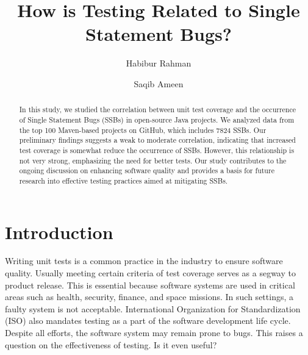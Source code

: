 \documentclass[sigconf,nonacm]{acmart}
\begin{document}
\title{How is Testing Related to Single Statement Bugs?}

\author{Habibur Rahman}

\author{Saqib Ameen}
\authornotemark[1]
\authornotemark[2]




\begin{abstract}
	In this study, we studied the correlation between unit test coverage and the occurrence of Single Statement Bugs (SSBs) in open-source Java projects. We analyzed data from the top 100 Maven-based projects on GitHub, which includes 7824 SSBs. Our preliminary findings suggests a weak to moderate correlation, indicating that increased test coverage is somewhat reduce the occurrence of SSBs. However, this relationship is not very strong, emphasizing the need for better tests. Our study contributes to the ongoing discussion on enhancing software quality and provides a basis for future research into effective testing practices aimed at mitigating SSBs.
	\end{abstract}	


\maketitle
{}
\section{Introduction}
Writing unit tests is a common practice in the industry to ensure software quality. Usually meeting certain criteria of test coverage serves as a segway to product release. This is essential because software systems are used in critical areas such as health, security, finance, and space missions. In such settings, a faulty system is not acceptable. International Organization for Standardization (ISO) also mandates testing as a part of the software development life cycle. Despite all efforts, the software system may remain prone to bugs. This raises a question on the effectiveness of testing. Is it even useful?
\end{document}
